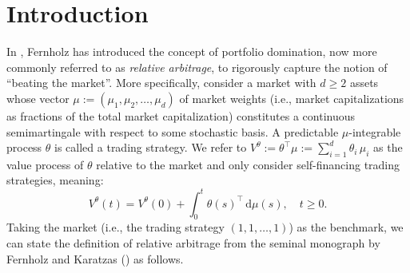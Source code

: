 \documentclass[11pt]{amsart}
\numberwithin{equation}{section}
\begin{document}
\begin{abstract}
We give a new formulation of the relative arbitrage problem from stochastic portfolio theory that asks for a time horizon beyond which arbitrage relative to the market exists in all ``sufficiently volatile'' markets. In our formulation, ``sufficiently volatile'' is interpreted as a lower bound on an ordered eigenvalue of the instantaneous covariation matrix, a quantity that has been studied extensively in the empirical finance literature. Upon framing the problem in the language of stochastic optimal control, we characterize the time horizon in question through the unique upper semicontinuous viscosity solution of a fully nonlinear elliptic partial differential equation (PDE). In a special case, this PDE amounts to the arrival time formulation of the Ambrosio-Soner co-dimension mean curvature flow. Beyond the setting of stochastic portfolio theory, the stochastic optimal control problem is analyzed for arbitrary compact, possibly non-convex, domains, thanks to a boundedness assumption on the instantaneous covariation matrix. 
\end{abstract}

\maketitle

\section{Introduction} \label{sec1}

In \cite[Section 3.3]{fernholz_stochastic_2002}, Fernholz has introduced the concept of portfolio domination, now more commonly referred to as \textit{relative arbitrage}, to rigorously capture the notion of ``beating the market''. More specifically, consider a market with $d\ge2$ assets whose vector $\mu:=(\mu_1,\mu_2,\ldots,\mu_d)$ of market weights (i.e., market capitalizations as fractions of the total market capitalization) constitutes a continuous semimartingale with respect to some stochastic basis. A predictable $\mu$-integrable process $\theta$ is called a trading strategy. We refer to $V^{\theta}:=\theta^{\top} \mu := \sum_{i=1}^d \theta_i \,\mu_i$ as the value process of $\theta$ relative to the market and only consider self-financing trading strategies, meaning:  
\begin{equation}
V^{\theta}(t) = V^\theta(0)+\int_0^t \theta(s)^{\top}\,\mathrm{d}\mu(s), \quad t\geq 0.
\end{equation}
Taking the market (i.e., the trading strategy $(1,1,\ldots,1)$) as the benchmark, we can state the definition of relative arbitrage from the seminal monograph by Fernholz and Karatzas (\cite[Definition 6.1]{karatzas_stochastic_2009}) as follows.
\end{document}
